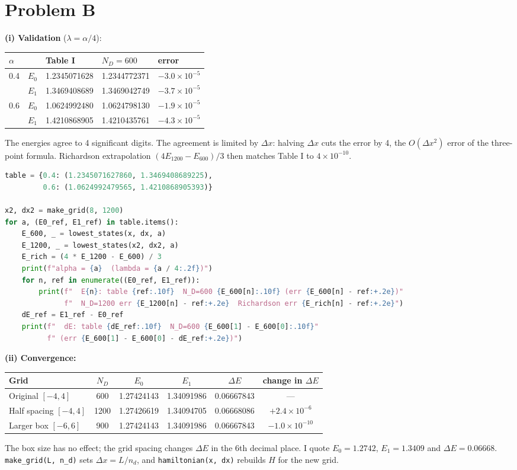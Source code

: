 \documentclass[11pt]{article}
\begin{document}
\section*{Problem B}
\textbf{(i) Validation} ($\lambda = \alpha/4$):
\begin{center}
\begin{tabular}{lllll}
\toprule
$\alpha$ & & Table I & $N_D = 600$ & error \\
\midrule
0.4 & $E_0$ & 1.2345071628 & 1.2344772371 & $-3.0\times10^{-5}$ \\
    & $E_1$ & 1.3469408689 & 1.3469042749 & $-3.7\times10^{-5}$ \\
0.6 & $E_0$ & 1.0624992480 & 1.0624798130 & $-1.9\times10^{-5}$ \\
    & $E_1$ & 1.4210868905 & 1.4210435761 & $-4.3\times10^{-5}$ \\
\bottomrule
\end{tabular}
\end{center}
The energies agree to 4 significant digits.
The agreement is limited by $\Delta x$: halving $\Delta x$ cuts the error by 4, the $O(\Delta x^2)$ error of the three-point formula.
Richardson extrapolation $(4E_{1200}-E_{600})/3$ then matches Table I to $4\times10^{-10}$.

\begin{lstlisting}[language=Python]
table = {0.4: (1.2345071627860, 1.3469408689225),
         0.6: (1.0624992479565, 1.4210868905393)}

x2, dx2 = make_grid(8, 1200)
for a, (E0_ref, E1_ref) in table.items():
    E_600, _ = lowest_states(x, dx, a)
    E_1200, _ = lowest_states(x2, dx2, a)
    E_rich = (4 * E_1200 - E_600) / 3
    print(f"alpha = {a}  (lambda = {a / 4:.2f})")
    for n, ref in enumerate((E0_ref, E1_ref)):
        print(f"  E{n}: table {ref:.10f}  N_D=600 {E_600[n]:.10f} (err {E_600[n] - ref:+.2e})"
              f"  N_D=1200 err {E_1200[n] - ref:+.2e}  Richardson err {E_rich[n] - ref:+.2e}")
    dE_ref = E1_ref - E0_ref
    print(f"  dE: table {dE_ref:.10f}  N_D=600 {E_600[1] - E_600[0]:.10f}"
          f" (err {E_600[1] - E_600[0] - dE_ref:+.2e})")
\end{lstlisting}

\noindent
\textbf{(ii) Convergence:}
\begin{center}
\begin{tabular}{lccccc}
\toprule
Grid & $N_D$ & $E_0$ & $E_1$ & $\Delta E$ & change in $\Delta E$ \\
\midrule
Original $[-4,4]$ & 600 & 1.27424143 & 1.34091986 & 0.06667843 & --- \\
Half spacing $[-4,4]$ & 1200 & 1.27426619 & 1.34094705 & 0.06668086 & $+2.4\times10^{-6}$ \\
Larger box $[-6,6]$ & 900 & 1.27424143 & 1.34091986 & 0.06667843 & $-1.0\times10^{-10}$ \\
\bottomrule
\end{tabular}
\end{center}
The box size has no effect; the grid spacing changes $\Delta E$ in the 6th decimal place.
I quote $E_0 = 1.2742$, $E_1 = 1.3409$ and $\Delta E = 0.06668$.
\texttt{make\_grid(L, n\_d)} sets $\Delta x = L/n_d$, and \texttt{hamiltonian(x, dx)} rebuilds $H$ for the new grid.
\end{document}
